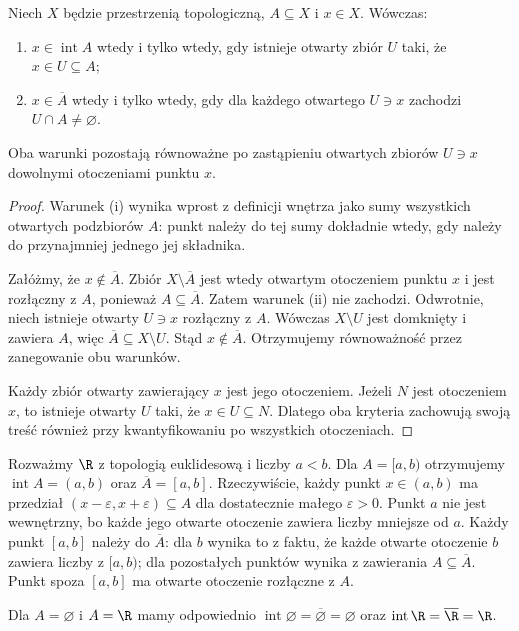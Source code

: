 \begin{twierdzenie}
\label{thm:topog-punktowa-charakteryzacja}
Niech $X$ będzie przestrzenią topologiczną, $A\subseteq X$ i $x\in X$.
Wówczas:
\begin{enumerate}[label=(\roman*)]
\item $x\in\operatorname{int}A$ wtedy i tylko wtedy, gdy istnieje
      otwarty zbiór $U$ taki, że $x\in U\subseteq A$;
\item $x\in\overline A$ wtedy i tylko wtedy, gdy dla każdego
      otwartego $U\ni x$ zachodzi $U\cap A\ne\varnothing$.
\end{enumerate}
Oba warunki pozostają równoważne po zastąpieniu otwartych
zbiorów $U\ni x$ dowolnymi otoczeniami punktu $x$.
\end{twierdzenie}
\begin{proof}
Warunek (i) wynika wprost z definicji wnętrza jako sumy
wszystkich otwartych podzbiorów $A$: punkt należy do tej sumy
dokładnie wtedy, gdy należy do przynajmniej jednego jej składnika.

Załóżmy, że $x\notin\overline A$. Zbiór $X\setminus\overline A$
jest wtedy otwartym otoczeniem punktu $x$ i jest rozłączny z $A$,
ponieważ $A\subseteq\overline A$. Zatem warunek (ii) nie zachodzi.
Odwrotnie, niech istnieje otwarty $U\ni x$ rozłączny z $A$.
Wówczas $X\setminus U$ jest domknięty i zawiera $A$,
więc $\overline A\subseteq X\setminus U$. Stąd
$x\notin\overline A$. Otrzymujemy równoważność przez
zanegowanie obu warunków.

Każdy zbiór otwarty zawierający $x$ jest jego otoczeniem.
Jeżeli $N$ jest otoczeniem $x$, to istnieje otwarty
$U$ taki, że $x\in U\subseteq N$.
Dlatego oba kryteria zachowują swoją treść również przy
kwantyfikowaniu po wszystkich otoczeniach.
\end{proof}

\begin{przyklad}
\label{ex:topog-wnetrze-domkniecie-przedzialu}
Rozważmy $\R$ z topologią euklidesową i liczby $a<b$.
Dla $A=[a,b)$ otrzymujemy
$\operatorname{int}A=(a,b)$ oraz $\overline A=[a,b]$.
Rzeczywiście, każdy punkt $x\in(a,b)$ ma przedział
$(x-\varepsilon,x+\varepsilon)\subseteq A$ dla dostatecznie
małego $\varepsilon>0$. Punkt $a$ nie jest wewnętrzny,
bo każde jego otwarte otoczenie zawiera liczby mniejsze od $a$.
Każdy punkt $[a,b]$ należy do $\overline A$: dla $b$
wynika to z faktu, że każde otwarte otoczenie $b$
zawiera liczby z $[a,b)$; dla pozostałych punktów
wynika z zawierania $A\subseteq\overline A$.
Punkt spoza $[a,b]$ ma otwarte otoczenie rozłączne z $A$.

Dla $A=\varnothing$ i $A=\R$ mamy odpowiednio
$\operatorname{int}\varnothing=\overline\varnothing=\varnothing$
oraz $\operatorname{int}\R=\overline\R=\R$.
\end{przyklad}

